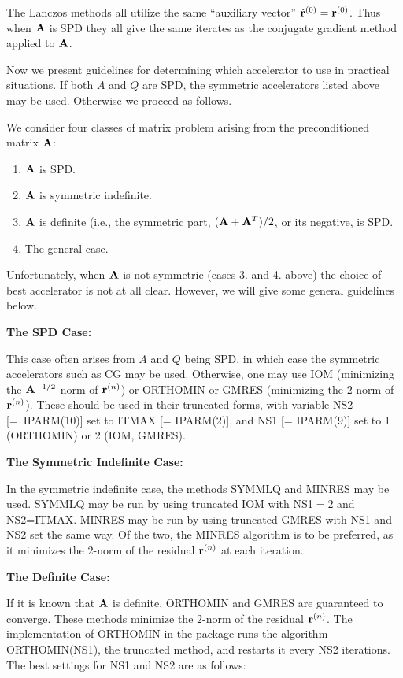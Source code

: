 The Lanczos methods all utilize the same ``auxiliary vector'' 
$\tilde{{\bf r}}^{(0)} = {\bf r}^{(0)}$.  Thus when ${\bf A}$ is
SPD they all give the same iterates as the conjugate gradient method
applied to ${\bf A}$.

Now we present guidelines for determining which accelerator to use in
practical situations.  If both $A$ and $Q$ are SPD, the
symmetric accelerators listed above may be used.  Otherwise we proceed
as follows.

    We consider four classes of matrix problem arising from the preconditioned
matrix ${\bf A}$:

\begin{enumerate}
  \item ${\bf A}$ is SPD.
  \item ${\bf A}$ is symmetric indefinite.
  \item ${\bf A}$ is definite (i.e., the symmetric part, $({\bf A}+{\bf A}^T)/2$, 
          or its negative, is SPD.
  \item The general case.
\end{enumerate}

Unfortunately, when ${\bf A}$ is not symmetric (cases 3. and 4. above)
the choice of best accelerator is not at all clear.  However, we will give
some general guidelines below.  
 
\bigskip
\noindent
{\bf The SPD Case:}
\bigskip

    This case often arises from $A$ and $Q$ being SPD, in which case 
the symmetric accelerators such as CG may be used. Otherwise, one may 
use IOM (minimizing the ${\bf A}^{-1/2}$-norm of ${\bf r}^{(n)}$) or ORTHOMIN 
or GMRES (minimizing the $2$-norm of ${\bf r}^{(n)}$).  These should be used
in their truncated forms, with variable NS2 \mbox{[= IPARM(10)]} set to
ITMAX [= IPARM(2)], and NS1 [= IPARM(9)] set to 1 (ORTHOMIN) or 2 
(IOM, GMRES).  
 
\bigskip
\noindent
{\bf The Symmetric Indefinite Case:}
\bigskip

    In the symmetric indefinite case, the methods SYMMLQ and MINRES
may be used.  SYMMLQ may be run by using truncated IOM with NS1$=2$
and NS2=ITMAX.  MINRES may be run by using truncated
GMRES with NS1 and NS2 set the same way.  Of the two, the MINRES 
algorithm is to be preferred, as it minimizes the $2$-norm of the residual
${\bf r}^{(n)}$ at each iteration.
 
\bigskip
\noindent
{\bf The Definite Case:}
\bigskip

    If it is known that ${\bf A}$ is definite, ORTHOMIN and GMRES
are guaranteed to converge. These methods minimize the $2$-norm of 
the residual ${\bf r}^{(n)}$. The implementation of ORTHOMIN in the 
package runs the algorithm ORTHOMIN(NS1), the truncated method, 
and restarts it every NS2 iterations.  The best settings for NS1 and
NS2 are as follows:

